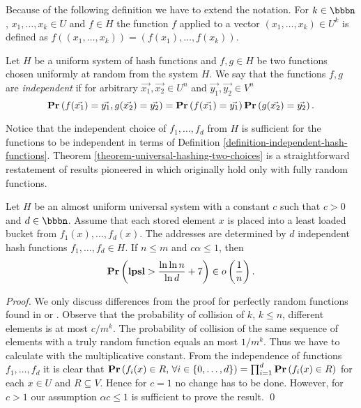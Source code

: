 Because of the following definition we have to extend the notation. For $k \in \bbbn$, $x_1, \dots, x_k \in U$ and $f \in H$ the function $f$ applied to a vector $(x_1, \dots, x_k) \in U^k$ is defined as $f((x_1, \dots, x_k)) = (f(x_1), \dots, f(x_k))$.
\begin{definition}
\label{definition-independent-hash-functions}
Let $H$ be a uniform system of hash functions and $f, g \in H$ be two functions chosen uniformly at random from the system $H$. We say that the functions $f, g$ are \emph{independent} if for arbitrary $\vec{x_1}, \vec{x_2} \in U^n$  and $\vec{y_1}, \vec{y_2} \in V^n$ $$\mathbf{Pr}\left(f(\vec{x_1}) = \vec{y_1}, g(\vec{x_2}) = \vec{y_2}\right) = \mathbf{Pr}\left(f(\vec{x_1}) = \vec{y_1}\right) \mathbf{Pr}\left(g(\vec{x_2}) = \vec{y_2}\right).$$
\end{definition}

Notice that the independent choice of $f_1, \dots, f_d$ from $H$ is sufficient for the functions to be independent in terms of Definition \ref{definition-independent-hash-functions}. Theorem \ref{theorem-universal-hashing-two-choices} is a straightforward restatement of results pioneered in \cite{DBLP:conf/stoc/AzarBKU94} which originally hold only with fully random functions.

\begin{theorem}
\label{theorem-universal-hashing-two-choices}
Let $H$ be an almost uniform universal system with a constant $c$ such that $c > 0$ and $d \in \bbbn$. Assume that each stored element $x$ is placed into a least loaded bucket from $f_1(x), \dots, f_d(x)$. The addresses are determined by $d$ independent hash functions $f_1, \dots, f_d \in H$. If $n \leq m$ and $c \alpha \leq 1$, then $$\mathbf{Pr}\left(\mathbf{lpsl} > \frac{\ln \ln n}{\ln d} + 7\right) \in o\left(\frac{1}{n}\right).$$
\end{theorem}
\begin{proof}
We only discuss differences from the proof for perfectly random functions found in \cite{Mitzenmacher:2005:PCR:1076315} or \cite{DBLP:conf/stoc/AzarBKU94}. Observe that the probability of collision of $k$, $k \leq n$, different elements is at most ${c}/{m^k}$. The probability of collision of the same sequence of elements with a truly random function equals an most ${1}/{m^k}$. Thus we have to calculate with the multiplicative constant.
From the independence of functions $f_1, \dots, f_d$ it is clear that $\mathbf{Pr}\left(f_i(x) \in R,\, \forall i \in \{0, \dots, d\}\right) = \prod_{i = 1}^{d}\mathbf{Pr}\left(f_i(x) \in R\right)$ for each $x \in U$ and $R \subseteq V$. Hence for $c = 1$ no change has to be done. However, for $c > 1$ our assumption $\alpha c \leq 1$ is sufficient to prove the result.
\qed
\end{proof}

